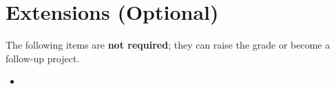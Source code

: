 \chapter{Extensions (Optional)}
\label{ch:extensions}

The following items are \textbf{not required}; they can raise the grade or become a follow-up project.
\begin{itemize}
  \item {}
\end{itemize}
